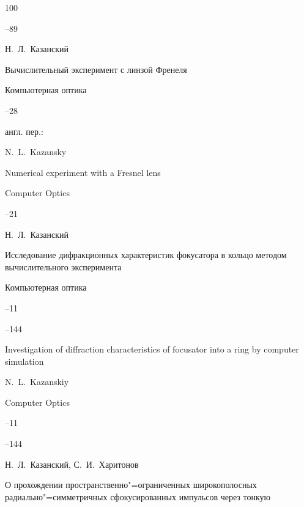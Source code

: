 \begin{thebibliography}{100}


--89






\by  Н.~Л.~Казанский

\paper Вычислительный эксперимент с линзой Френеля

\jour Компьютерная оптика



--28

\transl англ. пер.:~

\by N.~L.~Kazansky 

\paper Numerical experiment with a Fresnel lens 

\jour Computer Optics




--21








\by Н.~Л.~Казанский

\paper Исследование дифракционных характеристик фокусатора в кольцо методом вычислительного эксперимента

\jour  Компьютерная оптика


--11

--144

\misctransl

\paper  Investigation of diffraction characteristics of focusator into a ring by computer simulation 

\by N.~L.~Kazanskiy 

\jour Computer Optics


--11

--144






\by  Н.~Л.~Казанский, С.~И.~Харитонов

\paper О прохождении пространственно"=ограниченных широкополосных радиально"=симметричных сфокусированных импульсов через тонкую


\end{thebibliography}
